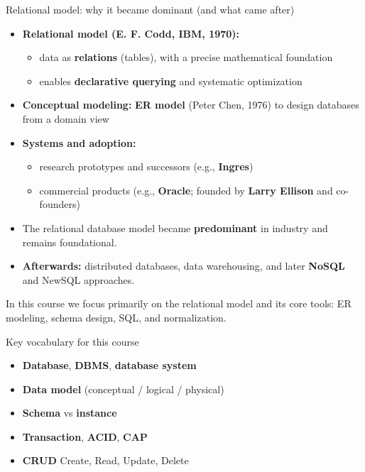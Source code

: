 \documentclass[10pt,aspectratio=169]{beamer}
\begin{document}
\begin{frame}{Relational model: why it became dominant (and what came after)}
\begin{itemize}
  \item \textbf{Relational model (E. F. Codd, IBM, 1970):}
    \begin{itemize}
      \item data as \textbf{relations} (tables), with a precise mathematical foundation
      \item enables \textbf{declarative querying} and systematic optimization
    \end{itemize}
  \item \textbf{Conceptual modeling:} \textbf{ER model} (Peter Chen, 1976) to design databases from a domain view
  \item \textbf{Systems and adoption:}
    \begin{itemize}
      \item research prototypes and successors (e.g., \textbf{Ingres})
      \item commercial products (e.g., \textbf{Oracle}; founded by \textbf{Larry Ellison} and co-founders)
    \end{itemize}
  \item The relational database model became \textbf{predominant} in industry and remains foundational.
  \item \textbf{Afterwards:} distributed databases, data warehousing, and later \textbf{NoSQL} and NewSQL approaches.
\end{itemize}

\vspace{0.3em}
\alert{In this course we focus primarily on the relational model and its core tools: ER modeling, schema design, SQL, and normalization.}
\end{frame}

\begin{frame}{Key vocabulary for this course}
\begin{itemize}
  \item \textbf{Database}, \textbf{DBMS}, \textbf{database system}
  \item \textbf{Data model} (conceptual / logical / physical)
  \item \textbf{Schema} vs \textbf{instance}
  \item \textbf{Transaction}, \textbf{ACID}, \textbf{CAP}
  \item \textbf{CRUD} Create, Read, Update, Delete
\end{itemize}
\end{frame}
\end{document}
